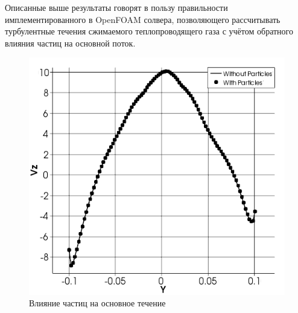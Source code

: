 Описанные выше результаты говорят в пользу правильности имплементированного в OpenFOAM солвера, позволяющего рассчитывать турбулентные течения сжимаемого теплопроводящего газа с учётом обратного влияния частиц на основной поток.
\begin{figure}[h]
	\centering
	\includegraphics[scale=0.7]{parcelsInteraction}
	\caption{Влияние частиц на основное течение}
	\label{fig:parcelsInteraction}
\end{figure}